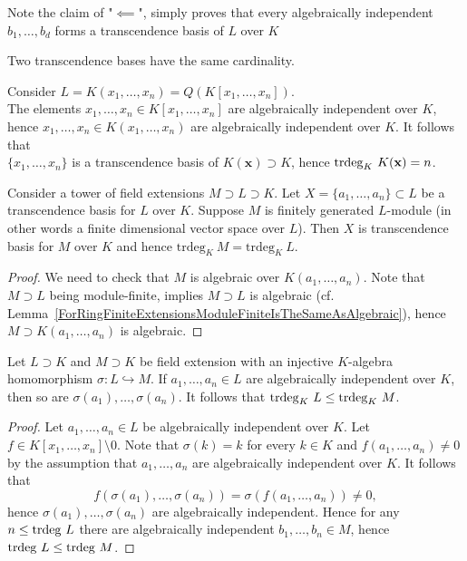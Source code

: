 \begin{remark}
    Note the claim of "$\impliedby$", simply proves that every algebraically independent $b_1,\dots,b_d$ forms a transcendence basis of $L$ over $K$ 
\end{remark}
\begin{corollary}
    Two transcendence bases have the same cardinality. 
\end{corollary}
\begin{example}\label{TranscendenceDegreeOfQuotientFieldOfPolynomialRing}
    Consider $L=K(x_1,\dots,x_n)=Q(K[x_1,\dots,x_n])$.\\ The elements $x_1,\dots,x_n\in K[x_1,\dots,x_n]$ are algebraically independent over $K$, hence $x_1,\dots,x_n\in K(x_1,\dots,x_n)$ are algebraically independent over $K$. It follows that\\ $\{x_1,\dots,x_n\}$ is a transcendence basis of $K(\mathbf{x})\supset K$, hence $\mathrm{trdeg }_K \ K(\mathbf{x}) = n$. 
\end{example}
\begin{corollary}\label{TrcBasisExtendsWhenExtFinGen}
    Consider a tower of field extensions $M\supset L\supset K$. Let $X=\{a_1,\dots,a_n\}\subset L$ be a transcendence basis for $L$ over $K$. Suppose $M$ is finitely generated $L$-module (in other words a finite dimensional vector space over $L$). Then $X$ is transcendence basis for $M$ over $K$ and hence $\text{trdeg}_K\ M = \text{trdeg}_K\ L$.
\end{corollary}
\begin{proof}
    We need to check that $M$ is algebraic over $K(a_1,\dots,a_n)$. Note that $M\supset L$ being module-finite, implies $M\supset L$ is algebraic (cf. Lemma~\ref{ForRingFiniteExtensionsModuleFiniteIsTheSameAsAlgebraic}), hence $M\supset K(a_1,\dots,a_n)$ is algebraic. 
\end{proof}
\begin{lemma}\label{InjectiveKAlgebraHomomorphismImpliesSmallerTranscendenceDegree}
    Let $L\supset K$ and $M\supset K$ be field extension with an injective $K$-algebra homomorphism $\sigma: L\hookrightarrow M$. If $a_1,\dots,a_n\in L$ are algebraically independent over $K$, then so are $\sigma(a_1),\dots,\sigma(a_n)$. It follows that $\trdeg_K\ L \leq \trdeg_K\ M$.\\
\end{lemma}
\begin{proof}
    Let $a_1,\dots,a_n\in L$ be algebraically independent over $K$.  Let $f\in K[x_1,\dots,x_n]\setminus 0$. Note that $\sigma(k)=k$ for every $k\in K$ and $f(a_1,\dots,a_n)\neq 0$ by the assumption that $a_1,\dots, a_n$ are algebraically independent over $K$. It follows that
    $$f(\sigma(a_1),\dots,\sigma(a_n))= \sigma(f(a_1,\dots,a_n))\neq 0,$$
    hence $\sigma(a_1),\dots,\sigma(a_n)$ are algebraically independent. Hence for any $n\leq \mathrm{trdeg } \ L$ there are algebraically independent $b_1,\dots,b_n\in M$, hence $\mathrm{trdeg }\ L \leq \mathrm{trdeg }\ M$.
\end{proof}
